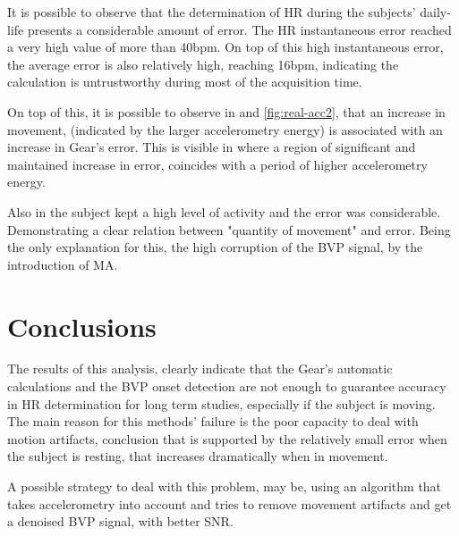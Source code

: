 It is possible to observe that the determination of HR during the subjects' daily-life presents a considerable amount of error. The HR instantaneous error reached a very high value of more than 40bpm. On top of this high instantaneous error, the average error is also relatively high, reaching 16bpm, indicating the calculation is untrustworthy during most of the acquisition time.

On top of this, it is possible to observe in  and \ref{fig:real-acc2}, that an increase in movement, (indicated by the larger accelerometry energy) is associated with an increase in Gear's error. This is visible in  where a region of significant and maintained increase in error, coincides with a period of higher accelerometry energy.

Also in  the subject kept a high level of activity and the error was considerable. Demonstrating a clear relation between "quantity of movement" and error. Being the only explanation for this, the high corruption of the BVP signal, by the introduction of MA.

\section{Conclusions}



The results of this analysis, clearly indicate that the Gear's automatic calculations and the BVP onset detection are not enough to guarantee accuracy in HR determination for long term studies, especially if the subject is moving. The main reason for this methods' failure is the poor capacity to deal with motion artifacts, conclusion that is supported by the relatively small error when the subject is resting, that increases dramatically when in movement.


A possible strategy to deal with this problem, may be, using an algorithm that takes accelerometry into account and tries to remove movement artifacts and get a denoised BVP signal, with better SNR.
